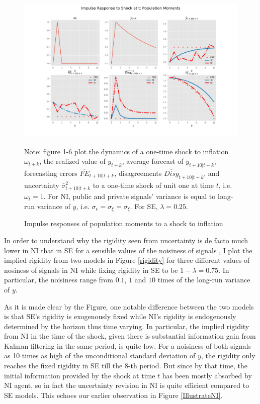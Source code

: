 \documentclass[]{article}
\begin{document}
	
	\begin{figure}[ht]
		\centering
		\includegraphics[width=\textwidth]{figures/ir_popseni.png} 
		\begin{flushleft}
			{\footnotesize Note: figure 1-6 plot the dynamics of a one-time shock to inflation $\omega_{t+k}$, the realized value of $y_{t+k}$,  average forecast of $\bar y_{t+10|t+k}$, forecasting errors $\overline{FE}_{t+10|t+k}$, disagreements $\overline {Disg}_{t+10|t+k}$, and uncertainty $\bar \sigma^2_{t+10|t+k}$ to a one-time shock  of unit one at time $t$, i.e. $\omega_t=1$. For NI, public and private signals’ variance is equal to long-run variance of $y$, i.e. $\sigma_\epsilon = \sigma_\xi = \sigma_\xi $. For SE, $\lambda = 0.25$.  }
		\end{flushleft}
		\caption{Impulse responses of population moments to a shock to inflation}
		\label{ir_pop}
	\end{figure}
	
	
	
	In order to understand why the rigidity seen from uncertainty is de facto much lower in NI that in SE for a sensible values of the noisiness of signals , I plot the implied rigidity from two models in Figure \ref{rigidity} for three different values of nosiness of signals in NI while fixing rigidity in SE to be $1-\lambda =0.75$. In particular, the noisiness range from $0.1$, $1$ and $10$ times of the long-run variance of $y$. 
	
	As it is made clear by the Figure, one notable difference between the two models is that SE's rigidity is exogenously fixed while NI's rigidity is endogenously determined by the horizon thus time varying. In particular, the implied rigidity from NI in the time of the shock, given there is substantial information gain from Kalman filtering in the same period, is quite low. For a noisiness of both signals as 10 times as high of the unconditional standard deviation of $y$, the rigidity only reaches the fixed rigidity in SE till the 8-th period. But since by that time, the initial information provided by the shock at time $t$ has been mostly absorbed by NI agent, so in fact the uncertainty revision in NI is quite efficient compared to SE models.  This echoes our earlier observation in Figure \ref{IllustrateNI}. 
	
\end{document}
